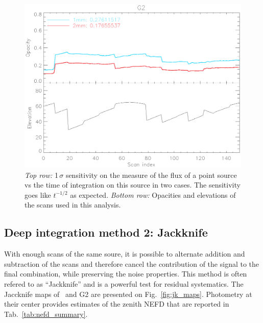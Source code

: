 \begin{figure}
\begin{center}
\includegraphics[clip, angle=0, scale =0.4]{Figures/g2_opacity_and_elev.eps}
\caption[NEFD vs time]{\emph{Top row:} 1\,$\sigma$ sensitivity on the
  measure of the flux of a point source vs the time of integration on this
  source in two cases. The sensitivity goes like $t^{-1/2}$ as
  expected. \emph{Bottom row:} Opacities and elevations of the scans used in
  this analysis.}
\label{fig:nefd_plots}
\end{center}
\end{figure}

\subsection{Deep integration method 2: Jackknife}

With enough scans of the same soure, it is possible to alternate addition and
subtraction of the scans and therefore cancel the contribution of the signal to
the final combination, while preserving the noise properties. This method is
often refered to as ``Jackknife'' and is a powerful test for residual
systematics. The Jaccknife maps of \hls\ and G2 are presented on
Fig.~\ref{fig:jk_maps}. Photometry at their center provides estimates of the
zenith NEFD that are reported in Tab.~\ref{tab:nefd_summary}.

